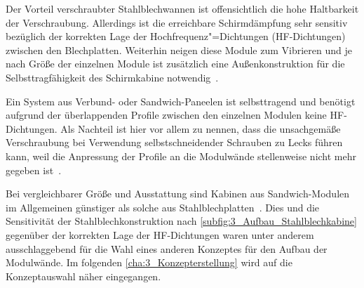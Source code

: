 Der Vorteil verschraubter Stahlblechwannen ist offensichtlich die hohe Haltbarkeit der Verschraubung. Allerdings ist die erreichbare Schirmdämpfung sehr sensitiv bezüglich der korrekten Lage der Hochfrequenz"=Dichtungen (HF-Dichtungen) zwischen den Blechplatten. Weiterhin neigen diese Module zum Vibrieren und je nach Größe der einzelnen Module ist zusätzlich eine Außenkonstruktion für die Selbsttragfähigkeit des Schirmkabine notwendig~\cite{EM_Schirmung}.
\par
\vspace{\linespace}
Ein System aus Verbund- oder Sandwich-Paneelen ist selbsttragend und benötigt aufgrund der überlappenden Profile zwischen den einzelnen Modulen keine HF-Dichtungen. Als Nachteil ist hier vor allem zu nennen, dass die unsachgemäße Verschraubung bei Verwendung selbstschneidender Schrauben zu Lecks führen kann, weil die Anpressung der Profile an die Modulwände stellenweise nicht mehr gegeben ist~\cite{EM_Schirmung}. 
\par
\vspace{\linespace}
Bei vergleichbarer Größe und Ausstattung sind Kabinen aus Sandwich-Modulen im Allgemeinen günstiger als solche aus Stahlblechplatten~\cite{EMC-Technik_Sandwichmodul, EMC-Technik_Stahlblechplatten}. Dies und die Sensitivität der Stahlblechkonstruktion nach \Abb\ref{subfig:3_Aufbau_Stahlblechkabine} gegenüber der korrekten Lage der HF-Dichtungen waren unter anderem ausschlaggebend für die Wahl eines anderen Konzeptes für den Aufbau der Modulwände. Im folgenden \Abschnitt\ref{cha:3_Konzepterstellung} wird auf die Konzeptauswahl näher eingegangen.  %





